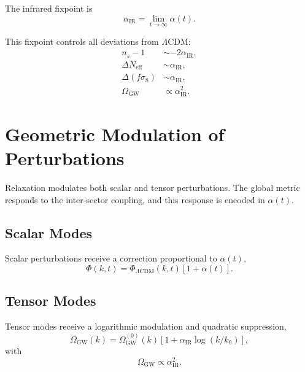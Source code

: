 \documentclass[11pt,a4paper]{article}
\begin{document}
The infrared fixpoint is
\begin{equation}
\alpha_{\mathrm{IR}} = \lim_{t \to \infty} \alpha(t).
\end{equation}

This fixpoint controls all deviations from $\Lambda$CDM:
\begin{align}
n_s - 1 &\sim -2\alpha_{\mathrm{IR}}, \\
\Delta N_{\mathrm{eff}} &\sim \alpha_{\mathrm{IR}}, \\
\Delta(f\sigma_8) &\sim \alpha_{\mathrm{IR}}, \\
\Omega_{\mathrm{GW}} &\propto \alpha_{\mathrm{IR}}^2.
\end{align}

\section{Geometric Modulation of Perturbations}

Relaxation modulates both scalar and tensor perturbations. The global metric
responds to the inter-sector coupling, and this response is encoded in
$\alpha(t)$.

\subsection[Scalar Modes]{Scalar Modes}

Scalar perturbations receive a correction proportional to $\alpha(t)$,
\begin{equation}
\Phi(k,t) = \Phi_{\Lambda\mathrm{CDM}}(k,t)
\left[ 1 + \alpha(t) \right].
\end{equation}

\subsection[Tensor Modes]{Tensor Modes}

Tensor modes receive a logarithmic modulation and quadratic suppression,
\begin{equation}
\Omega_{\mathrm{GW}}(k)
=
\Omega_{\mathrm{GW}}^{(0)}(k)
\left[ 1 + \alpha_{\mathrm{IR}} \log(k/k_0) \right],
\end{equation}
with
\begin{equation}
\Omega_{\mathrm{GW}} \propto \alpha_{\mathrm{IR}}^2.
\end{equation}
\end{document}

